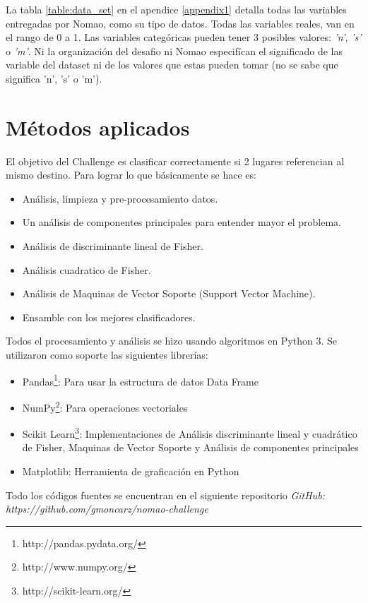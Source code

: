 \documentclass[journal]{IEEEtran}
\begin{document}
La tabla \ref{table:data_set} en el apendice \ref{appendix1} detalla todas las variables entregadas por 
Nomao, como su tipo de datos. Todas las variables reales, van en el rango de 0 a 1. Las variables
categóricas pueden tener 3 posibles valores: \textit{'n'}, \textit{'s'} 
o \textit{'m'}. Ni la organización del desafio ni Nomao especifícan 
el significado de las variable del dataset ni de los valores
que estas pueden tomar (no se sabe que significa 'n', 's' o 'm').


\section{Métodos aplicados}

El objetivo del Challenge es clasificar correctamente si 2 lugares
referencian al mismo destino. Para lograr lo que básicamente se hace es:
\begin{itemize}
\item Análisis, limpieza y pre-procesamiento datos. 
\item Un análisis de componentes principales para entender mayor el problema. 
\item Análisis de discriminante lineal de Fisher.
\item Análisis cuadratico de Fisher.
\item Análisis de Maquinas de Vector Soporte (Support Vector Machine).
\item Ensamble con los mejores clasificadores.
\end{itemize}

Todos el procesamiento y análisis se hizo usando algoritmos en Python 3. Se
utilizaron como soporte las siguientes librerías:
\begin{itemize}
\item Pandas\footnote{http://pandas.pydata.org/}: Para usar la estructura de datos Data Frame
\item NumPy\footnote{http://www.numpy.org/}: Para operaciones vectoriales
\item Scikit Learn\footnote{http://scikit-learn.org/}: Implementaciones de Análisis discriminante lineal
	y cuadrático de Fisher, Maquinas de Vector Soporte y Análisis
	de componentes principales
\item Matplotlib: Herramienta de graficación en Python
\end{itemize}

Todo los códigos fuentes se encuentran en el siguiente repositorio
\textit{GitHub: https://github.com/gmoncarz/nomao-challenge}
\end{document}
